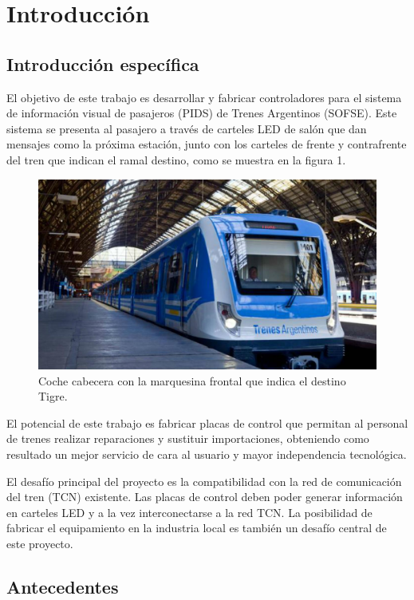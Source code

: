 \documentclass[
11pt, %
]{charter}
\begin{document}
\pagebreak


\section{Introducción}
\label{sec:intro}
\subsection{Introducción específica}
El objetivo de este trabajo es desarrollar y fabricar controladores para el sistema de información visual de pasajeros (PIDS) de Trenes Argentinos (SOFSE). Este sistema se presenta al pasajero a través de carteles LED de salón que dan mensajes como la próxima estación, junto con los carteles de frente y contrafrente del tren que indican el ramal destino, como se muestra en la figura 1. 

\begin{figure}[htpb]
\centering 
\includegraphics[width=.75\textwidth]{./Pics/tren.jpg}
\caption{Coche cabecera con la marquesina frontal que indica el destino Tigre.}
\label{fig:cartelFrente}
\end{figure}

El potencial de este trabajo es fabricar placas de control que permitan al personal de trenes realizar reparaciones y sustituir importaciones, obteniendo como resultado un mejor servicio de cara al usuario y mayor independencia tecnológica.

El desafío principal del proyecto es la compatibilidad con la red de comunicación del tren (TCN) existente. Las placas de control deben poder generar información en carteles LED y a la vez interconectarse a la red TCN. La posibilidad de fabricar el equipamiento en la industria local es también un desafío central de este proyecto.

\subsection{Antecedentes}
\end{document}
